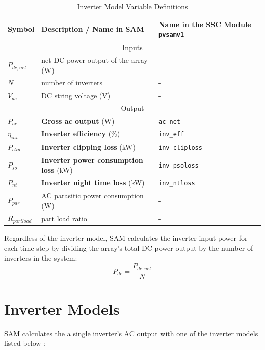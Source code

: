 \documentclass[12pt,letterpaper]{article}
\begin{document}
\begin{table}
\begin{center}
\caption{Inverter Model Variable Definitions}
\begin{tabular}{lll}
\midrule
Symbol & Description / \textbf{Name in SAM} & Name in the SSC Module \texttt{pvsamv1}\\
\midrule
\multicolumn{3}{c}{Inputs}\\
$P_{dc,net}$ & net DC power output of the array (W)& \\
$N$ & number of inverters & - \\
$V_{dc}$ & DC string voltage (V)& - \\
\midrule
\multicolumn{3}{c}{Output}\\
$P_{ac}$ & \textbf{Gross ac output} (W) & \texttt{ac\_net} \\
$\eta_{inv}$ & \textbf{Inverter efficiency} (\%)& \texttt{inv\_eff}  \\
$P_{clip}$ & \textbf{Inverter clipping loss} (kW)& \texttt{inv\_cliploss}  \\
$P_{so}$ & \textbf{Inverter power consumption loss} (kW)& \texttt{inv\_psoloss}  \\
$P_{nt}$ & \textbf{Inverter night time loss} (kW)& \texttt{inv\_ntloss}  \\
$P_{par}$ & AC parasitic power consumption (W) & - \\%
$R_{partload}$ & part load ratio & - \\
\midrule
\end{tabular}
\label{tab-invertervars}
\end{center}
\end{table}

Regardless of the inverter model, SAM calculates the inverter input power for each time step by dividing the array's total DC power output by the number of inverters in the system:
\begin{equation}\label{eqn-invinputpower}
P_{dc} = \frac{P_{dc,net}}{N}
\end{equation}

\section{Inverter Models}\label{sec-inverteroptions}

SAM calculates the a single inverter's AC output with one of the inverter models listed below \citep{blair2013}:
\end{document}
